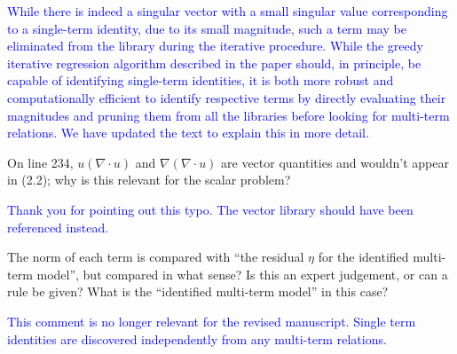 \documentclass{article}
\newcommand{\response}{\textcolor{blue}}
\begin{document}
\medskip
\response{
While there is indeed a singular vector with a small singular value corresponding to a single-term identity, due to its small magnitude, such a term may be eliminated from the library during the iterative procedure. While the greedy iterative regression algorithm described in the paper should, in principle, be capable of identifying single-term identities, it is both more robust and computationally efficient to identify respective terms by directly evaluating their magnitudes and pruning them from all the libraries before looking for multi-term relations. We have updated the text to explain this in more detail.
}

\medskip
 On line 234, $u(\nabla \cdot u)$ and $\nabla(\nabla
\cdot u)$ are vector quantities and wouldn’t appear in (2.2); why is
this relevant for the scalar problem?

\medskip
\response{Thank you for pointing out this typo. The vector library should have been referenced instead.}

\medskip
   The norm of each term is compared with “the residual
$\eta$ for the identified multi-term model”, but compared in what
sense?  Is this an expert judgement, or can a rule be given?  What is
the “identified multi-term model” in this case?

\medskip
\response{This comment is no longer relevant for the revised manuscript. Single term identities are discovered independently from any multi-term relations.}
\end{document}
